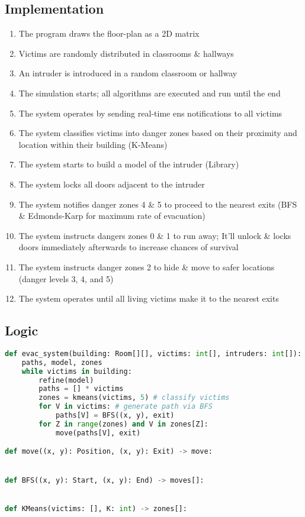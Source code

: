 \documentclass[12pt]{article}
\begin{document}
\subsection*{Implementation}
\begin{enumerate}
\item The program draws the floor-plan as a 2D matrix
\item Victims are randomly distributed in classrooms \& hallways
\item An intruder is introduced in a random classroom or hallway
\item The simulation starts; all algorithms are executed and run until the end
\item The system operates by sending real-time ens notifications to all victims
\item The system classifies victims into danger zones based on their proximity and location within their building (K-Means)
\item The system starts to build a model of the intruder (Library)
\item The system locks all doors adjacent to the intruder
\item The system notifies danger zones 4 \& 5 to proceed to the nearest exits (BFS \& Edmonds-Karp for maximum rate of evacuation)
\item The system instructs dangers zones 0 \& 1 to run away; It'll unlock \& locks doors immediately afterwards to increase chances of survival
\item The system instructs danger zones 2 to hide \& move to safer locations (danger levels 3, 4, and 5)
\item The system operates until all living victims make it to the nearest exits
\end{enumerate}
\subsection*{Logic}
\begin{lstlisting}[language=python]
def evac_system(building: Room[][], victims: int[], intruders: int[]):
	paths, model, zones
	while victims in building: 
		refine(model)
		paths = [] * victims
		zones = kmeans(victims, 5) # classify victims
		for V in victims: # generate path via BFS
			paths[V] = BFS((x, y), exit) 
		for Z in range(zones) and V in zones[Z]:
			move(paths[V], exit)

def move((x, y): Position, (x, y): Exit) -> move:


def BFS((x, y): Start, (x, y): End) -> moves[]:


def KMeans(victims: [], K: int) -> zones[]:

\end{lstlisting}
\end{document}
